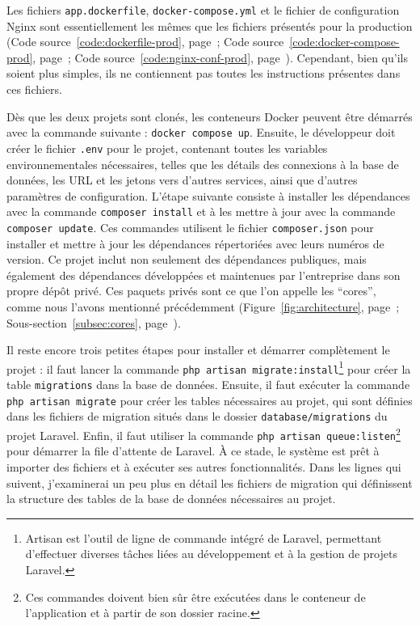 Les fichiers \Verb|app.dockerfile|, \Verb|docker-compose.yml| et le fichier de configuration Nginx sont essentiellement les mêmes que les fichiers présentés pour la production (Code source~\ref{code:dockerfile-prod}, page~\pageref{code:dockerfile-prod}; Code source~\ref{code:docker-compose-prod}, page~\pageref{code:docker-compose-prod}; Code source~\ref{code:nginx-conf-prod}, page~\pageref{code:nginx-conf-prod}). Cependant, bien qu'ils soient plus simples, ils ne contiennent pas toutes les instructions présentes dans ces fichiers.

Dès que les deux projets sont clonés, les conteneurs Docker peuvent être démarrés avec la commande suivante : \Verb|docker compose up|. Ensuite, le développeur doit créer le fichier \Verb|.env| pour le projet, contenant toutes les variables environnementales nécessaires, telles que les détails des connexions à la base de données, les URL et les jetons vers d'autres services, ainsi que d'autres paramètres de configuration. L'étape suivante consiste à installer les dépendances avec la commande \Verb|composer install| et à les mettre à jour avec la commande \Verb|composer update|. Ces commandes utilisent le fichier \Verb|composer.json| pour installer et mettre à jour les dépendances répertoriées avec leurs numéros de version. Ce projet inclut non seulement des dépendances publiques, mais également des dépendances développées et maintenues par l'entreprise dans son propre dépôt privé. Ces paquets privés sont ce que l'on appelle les \foreignquote{french}{cores}, comme nous l'avons mentionné précédemment (Figure~\ref{fig:architecture}, page~\pageref{fig:architecture}; Sous-section~\ref{subsec:cores}, page~\pageref{subsec:cores}).

Il reste encore trois petites étapes pour installer et démarrer complètement le projet : il faut lancer la commande \Verb|php artisan migrate:install|\footnote{Artisan est l'outil de ligne de commande intégré de Laravel, permettant d'effectuer diverses tâches liées au développement et à la gestion de projets Laravel.} pour créer la table \Verb|migrations| dans la base de données. Ensuite, il faut exécuter la commande \Verb|php artisan migrate| pour créer les tables nécessaires au projet, qui sont définies dans les fichiers de migration situés dans le dossier \Verb|database/migrations| du projet Laravel. Enfin, il faut utiliser la commande \Verb|php artisan queue:listen|\footnote{Ces commandes doivent bien sûr être exécutées dans le conteneur de l'application et à partir de son dossier racine.} pour démarrer la file d'attente de Laravel. À ce stade, le système est prêt à importer des fichiers et à exécuter ses autres fonctionnalités. Dans les lignes qui suivent, j'examinerai un peu plus en détail les fichiers de migration qui définissent la structure des tables de la base de données nécessaires au projet.